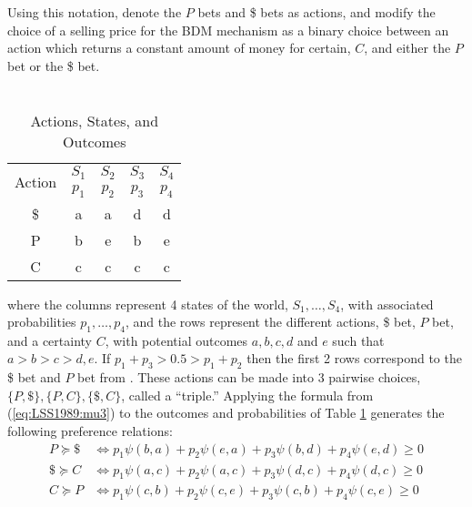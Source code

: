 \documentclass[../main.tex]{subfiles}
\begin{document}
Using this notation, \textcite{Loomes1989} denote the $P$ bets and {\$} bets as actions, and modify the choice of a selling price for the BDM mechanism as a binary choice between an action which returns a constant amount of money for certain, $C$, and either the $P$ bet or the {\$} bet.
\begin{table}[ht]
	\centering
	\caption{ \textcite[149]{Loomes1989} \\ Actions, States, and Outcomes }
	\label{tb:LSS1989:ASO}
	\begin{tabular}{ccccc}
		\multirow{2}{*}{Action} & $S_1$ & $S_2$ & $S_3$ & $S_4$ \\[-.75em]
		                        & $p_1$ & $p_2$ & $p_3$ & $p_4$ \\\hline
		                    {\$}  &   a   &   a   &   d   &   d   \\
		                    P   &   b   &   e   &   b   &   e   \\
		                    C   &   c   &   c   &   c   &   c   
	\end{tabular}
\end{table}
\noindent where the columns represent 4 states of the world, $S_1 , \ldots , S_4$, with associated probabilities $p_1, \ldots, p_4$, and the rows represent the different actions, {\$} bet, $P$ bet, and a certainty $C$, with potential outcomes $a,b,c,d$ and $e$ such that $a > b > c > d,e$.
If $p_1 + p_3 > 0.5 > p_1 + p_2$ then the first 2 rows correspond to the {\$} bet and $P$ bet from \textcite{Grether1979}.
These actions can be made into 3 pairwise choices, $\lbrace P , {\$} \rbrace , \lbrace P,C \rbrace , \lbrace {\$}, C \rbrace$, called a \enquote{triple.}
Applying the formula from (\ref{eq:LSS1989:mu3}) to the outcomes and probabilities of Table \ref{tb:LSS1989:ASO} generates the following preference relations:
\begin{align}
	P  \succcurlyeq {\$} &\Leftrightarrow p_1 \psi(b,a) + p_2 \psi(e,a) + p_3 \psi(b,d) + p_4 \psi(e,d) \geq 0 \label{eq:LSS1989:PD}\\
	{\$} \succcurlyeq C  &\Leftrightarrow p_1 \psi(a,c) + p_2 \psi(a,c) + p_3 \psi(d,c) + p_4 \psi(d,c) \geq 0 \label{eq:LSS1989:DC}\\
	C  \succcurlyeq P  &\Leftrightarrow p_1 \psi(c,b) + p_2 \psi(c,e) + p_3 \psi(c,b) + p_4 \psi(c,e) \geq 0 \label{eq:LSS1989:CP}
\end{align}
\end{document}
